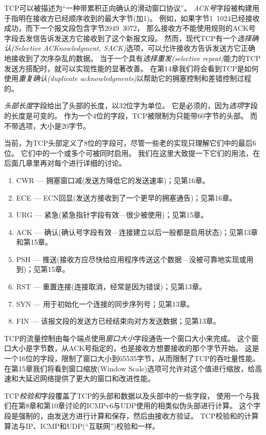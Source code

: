 \documentclass{../main.tex}{subfiles}
\begin{document}
TCP可以被描述为``一种带累积正向确认的滑动窗口协议''。
\emph{ACK号}字段被构建用于指明在接收方已经顺序收到的最大字节(加1)。
例如，如果字节1~1024已经接收成功，而下一个报文段包含字节2049~3072，
那么接收方不能使用规则的ACK号字段去发信告诉发送方它接收到了这个新报文段。
然而，现代TCP有一个\emph{选择确认(Selective ACKnowledgment,
SACK)}选项，可以允许接收方告诉发送方它正确地接收到了次序杂乱的数据。
当于一个具有\emph{选择重发(selective repeat)}能力的TCP发送方搭配时，就可以实现性能的显著改善。
在第14章我们将会看到TCP是如何使用\emph{重复确认(duplicate acknowledgments)}以帮助它的拥塞控制和差错控制过程的。

\emph{头部长度}字段给出了头部的长度，以32位字为单位。
它是必须的，因为\emph{选项}字段的长度是可变的。
作为一个4位的字段，TCP被限制为只能带60字节的头部。
而不带选项，大小是20字节。

当前，为TCP头部定义了8位的字段可，尽管一些老的实现只理解它们中的最后6位。
它们中的一个或多个可被同时启用。
我们在这里大致提一下它们的用法，在后面几章里再对每个进行详细的讨论。
\begin{enumerate}
  \item CWR --- 拥塞窗口减(发送方降低它的发送速率)；见第16章。
  \item ECE --- ECN回显(发送方接收到了一个更早的拥塞通告)；见第16章。
  \item URG --- 紧急(紧急指针字段有效---很少被使用)；见第15章。
  \item ACK --- 确认(确认号字段有效---连接建立以后一般都是启用状态)；见第13章和第15章。
  \item PSH --- 推送(接收方应尽快给应用程序传送这个数据---没被可靠地实现或用到)；见第15章。
  \item RST --- 重置连接(连接取消，经常是因为错误)；见第13章。
  \item SYN --- 用于初始化一个连接的同步序列号；见第13章。
  \item FIN --- 该报文段的发送方已经结束向对方发送数据；见第13章。
\end{enumerate}

TCP的流量控制由每个端点使用\emph{窗口大小}字段通告一个窗口大小来完成。
这个窗口大小是字节数，从ACK号指定的，也是接收方想要接收的那个字节开始。
这是一个16位的字段，限制了窗口大小到65535字节，从而限制了TCP的吞吐量性能。
在第15章我们将看到窗口缩放(Window Scale)选项可允许对这个值进行缩放，给高速和大延迟网络提供了更大的窗口和改进性能。

TCP\emph{校验和}字段覆盖了TCP的头部和数据以及头部中的一些字段，
使用一个与我们在第8章和第10章讨论的ICMPv6与UDP使用的相类似伪头部进行计算。
这个字段是强制的，由发送方进行计算和保存，然后由接收方验证。
TCP校验和的计算算法与IP、ICMP和UDP(``互联网'')校验和一样。
\end{document}
